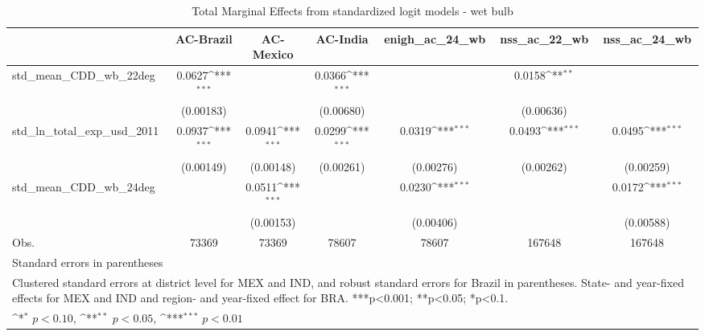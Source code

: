 \begin{table}[htbp]\centering
\def\sym#1{\ifmmode^{#1}\else\(^{#1}\)\fi}
\caption{Total Marginal Effects from standardized logit models - wet bulb}
\begin{tabular}{l*{6}{c}}
\hline\hline
            &\multicolumn{1}{c}{AC-Brazil}&\multicolumn{1}{c}{AC-Mexico}&\multicolumn{1}{c}{AC-India}&\multicolumn{1}{c}{enigh\_ac\_24\_wb}&\multicolumn{1}{c}{nss\_ac\_22\_wb}&\multicolumn{1}{c}{nss\_ac\_24\_wb}\\
\hline
std\_mean\_CDD\_wb\_22deg&      0.0627\sym{***}&                     &      0.0366\sym{***}&                     &      0.0158\sym{**} &                     \\
            &   (0.00183)         &                     &   (0.00680)         &                     &   (0.00636)         &                     \\
std\_ln\_total\_exp\_usd\_2011&      0.0937\sym{***}&      0.0941\sym{***}&      0.0299\sym{***}&      0.0319\sym{***}&      0.0493\sym{***}&      0.0495\sym{***}\\
            &   (0.00149)         &   (0.00148)         &   (0.00261)         &   (0.00276)         &   (0.00262)         &   (0.00259)         \\
std\_mean\_CDD\_wb\_24deg&                     &      0.0511\sym{***}&                     &      0.0230\sym{***}&                     &      0.0172\sym{***}\\
            &                     &   (0.00153)         &                     &   (0.00406)         &                     &   (0.00588)         \\
\hline
Obs.        &       73369         &       73369         &       78607         &       78607         &      167648         &      167648         \\
\hline\hline
\multicolumn{7}{l}{\footnotesize Standard errors in parentheses}\\
\multicolumn{7}{l}{\footnotesize Clustered standard errors at district level for MEX and IND, and robust standard errors for Brazil in parentheses. State- and year-fixed effects for MEX and IND and region- and year-fixed effect for BRA. ***p<0.001; **p<0.05; *p<0.1.}\\
\multicolumn{7}{l}{\footnotesize \sym{*} \(p<0.10\), \sym{**} \(p<0.05\), \sym{***} \(p<0.01\)}\\
\end{tabular}
\end{table}
